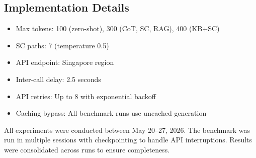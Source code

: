 \subsection{Implementation Details}

\begin{itemize}
\item Max tokens: 100 (zero-shot), 300 (CoT, SC, RAG), 400 (KB+SC)
\item SC paths: 7 (temperature 0.5)
\item API endpoint: Singapore region
\item Inter-call delay: 2.5 seconds
\item API retries: Up to 8 with exponential backoff
\item Caching bypass: All benchmark runs use uncached generation
\end{itemize}

All experiments were conducted between May 20--27, 2026. The benchmark was run in multiple sessions with checkpointing to handle API interruptions. Results were consolidated across runs to ensure completeness.
